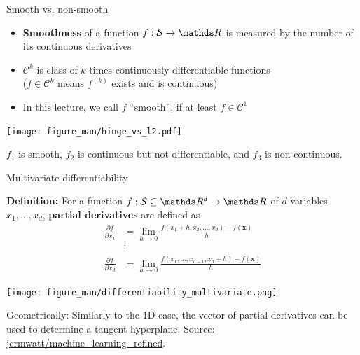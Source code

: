 \documentclass[11pt,compress,t,notes=noshow, xcolor=table]{beamer}
\begin{document}
\begin{vbframe}{Smooth vs. non-smooth}

\begin{itemize}
    \item \textbf{Smoothness} of a function  $f: \mathcal{S} \to \R$ is measured by the number of its continuous derivatives
    \item $\mathcal{C}^k$ is class of $k$-times continuously differentiable functions \\
        ($f\in\mathcal{C}^k$ means $f^{(k)}$ exists and is continuous)
    \item In this lecture, we call $f$ \enquote{smooth}, if at least $f \in \mathcal{C}^1$
\end{itemize}


\begin{center}
\texttt{[image: figure\_man/hinge\_vs\_l2.pdf]} \\
\begin{footnotesize}
$f_1$ is smooth, $f_2$ is continuous but not differentiable, and $f_3$ is non-continuous.
\end{footnotesize}
\end{center}


\end{vbframe}

\begin{vbframe}{Multivariate differentiability}

\textbf{Definition:} For a function $f: \mathcal{S}\subseteq \R^d \to \R$ of $d$ variables $x_1, \ldots, x_d$, \textbf{partial derivatives} are defined as
$$
\begin{aligned}
\frac{\partial f}{\partial x_1} & =\lim _{h \rightarrow 0} \frac{f\left(x_1+h, x_2, \ldots, x_d\right)-f(\boldsymbol{x})}{h} \\
& \vdots \\
\frac{\partial f}{\partial x_d} & =\lim _{h \rightarrow 0} \frac{f\left(x_1, \ldots, x_{d-1}, x_d+h\right)-f(\boldsymbol{x})}{h}
\end{aligned}
$$

\begin{center}
\texttt{[image: figure\_man/differentiability\_multivariate.png]} \\
\begin{footnotesize}
Geometrically: Similarly to the 1D case, the vector of partial derivatives can be used to determine a tangent hyperplane.
Source: \href{https://github.com/jermwatt/machine_learning_refined}{jermwatt/machine\_learning\_refined}.
\end{footnotesize}
\end{center}

\end{vbframe}
\end{document}
